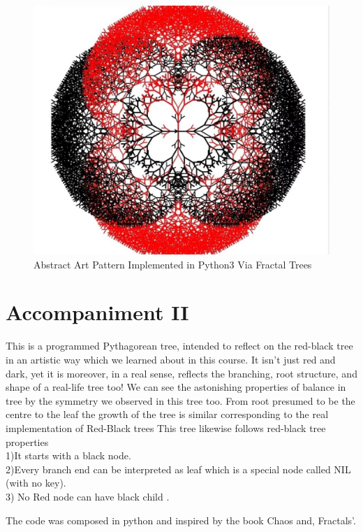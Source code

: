\documentclass[addpoints]{exam}
\begin{document}
\begin{figure}[h]
\begin{center}
              \includegraphics[height=.2\textheight, align=c]{tree3}
        \end{center}
  
  \caption{Abstract Art Pattern Implemented in Python3 Via Fractal Trees} 
  
\end{figure}

\section*{Accompaniment II }

This is a programmed  Pythagorean tree, intended to reflect on the red-black tree in an artistic way which we learned about in this course. It isn't just red and dark, yet it is moreover, in a real sense, reflects the branching, root structure, and shape of a real-life tree too! We can see the astonishing properties of balance in tree by the symmetry we observed in this tree too. From root presumed to be the centre to the leaf the growth of the tree is similar corresponding to the real implementation of Red-Black trees
This tree likewise follows red-black tree properties  \\
1)It starts with a black node.\\
2)Every branch end can be interpreted as  leaf which  is a special node called NIL (with no key).\\
3) No Red node can have black child .

The code was composed in python and inspired by the book Chaos and, Fractals'.
\end{document}
